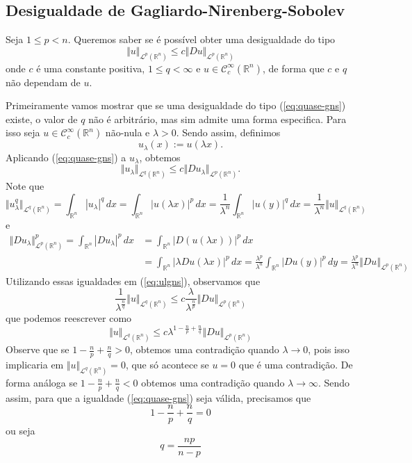 \documentclass[a4paper, 11pt]{book}
\theoremstyle{definition}
\newcommand{\bR}{\mathbb{R}}
\newcommand{\cC}{\mathcal{C}}
\newcommand{\cL}{\mathcal{L}}
\begin{document}
\subsection{Desigualdade de Gagliardo-Nirenberg-Sobolev}

Seja $1 \leqslant p < n$.
Queremos saber se é possível obter uma desigualdade do tipo
\begin{equation} \label{eq:quase-gns}
    \Vert u \Vert_{\cL^p(\bR^n)} \leqslant c \Vert Du \Vert_{\cL^p(\bR^n)}
\end{equation}
onde $c$ é uma constante positiva, $1 \leqslant q < \infty$ e $u \in \cC^\infty_c(\bR^n)$, de forma que $c$ e $q$ não dependam de $u$.

Primeiramente vamos mostrar que se uma desigualdade do tipo (\ref{eq:quase-gns}) existe, o valor de $q$ não é arbitrário, mas sim admite uma forma especifica.
Para isso seja $u \in \cC^\infty_c(\bR^n)$ não-nula e $\lambda > 0$.
Sendo assim, definimos
\[
    u_\lambda(x) := u(\lambda x).
\]
Aplicando (\ref{eq:quase-gns}) a $u_\lambda$, obtemos
\begin{equation} \label{eq:ulgns}
    \Vert u_\lambda \Vert_{\cL^q(\bR^n)} \leqslant c \Vert Du_\lambda \Vert_{\cL^p(\bR^n)}.
\end{equation}
Note que
\[
    \Vert u_\lambda^q \Vert_{\cL^q(\bR^n)} = \int_{\bR^n} |u_\lambda|^q \,dx = \int_{\bR^n} |u(\lambda x)|^p \,dx = \frac{1}{\lambda^n} \int_{\bR^n} |u(y)|^q \,dx = \frac{1}{\lambda^n}\Vert u \Vert_{\cL^q(\bR^n)}
\]
e
\[
    \begin{aligned}
        \Vert Du_\lambda \Vert_{\cL^p(\bR^n)}^p = \int_{\bR^n} |Du_\lambda|^p \,dx &= \int_{\bR^n} |D(u(\lambda x))|^p \,dx \\
        &= \int_{\bR^n} |\lambda Du(\lambda x)|^p \,dx = \frac{\lambda^p}{\lambda^n} \int_{\bR^n} |Du(y)|^p \,dy = \frac{\lambda^p}{\lambda^n}\Vert Du \Vert_{\cL^p(\bR^n)}
    \end{aligned}
\]
Utilizando essas igualdades em (\ref{eq:ulgns}), observamos que
\[
    \frac{1}{\lambda^{\frac{n}{q}}} \Vert u \Vert_{\cL^q(\bR^n)} \leqslant c \frac{\lambda}{\lambda^{\frac{n}{p}}}\Vert Du \Vert_{\cL^p(\bR^n)}
\]
que podemos reescrever como
\begin{equation}
    \Vert u \Vert_{\cL^q(\bR^n)} \leqslant c\lambda^{1 - \frac{n}{p}  + \frac{n}{q}}\Vert Du \Vert_{\cL^p(\bR^n)}
\end{equation}
Observe que se $1 - \frac{n}{p} + \frac{n}{q} > 0$, obtemos uma contradição quando $\lambda \to 0$, pois isso implicaria em $\Vert u \Vert_{\cL^q(\bR^n)} = 0$,
que só acontece se $u = 0$ que é uma contradição.
De forma análoga se $1 - \frac{n}{p} + \frac{n}{q} < 0$ obtemos uma contradição quando $\lambda \to \infty$.
Sendo assim, para que a igualdade (\ref{eq:quase-gns}) seja válida, precisamos que
\[
    1 - \frac{n}{p} + \frac{n}{q} = 0
\]
ou seja
\[
    q = \frac{np}{n - p}
\]
\end{document}
